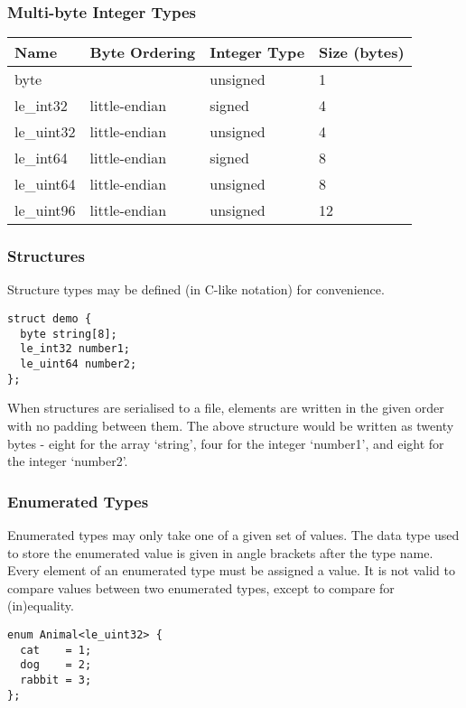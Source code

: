 \documentclass[10pt]{article}
\begin{document}
\subsubsection{Multi-byte Integer Types}
\begin{center}
\begin{tabular}{l l l l}
\hline
\textbf{Name} & \textbf{Byte Ordering} & \textbf{Integer Type} & \textbf{Size (bytes)} \\
\hline
byte & & unsigned & 1 \\
le\_int32 & little-endian & signed & 4 \\
le\_uint32 & little-endian & unsigned & 4 \\
le\_int64 & little-endian & signed & 8 \\
le\_uint64 & little-endian & unsigned & 8 \\
le\_uint96 & little-endian & unsigned & 12 \\
\end{tabular}
\end{center}

\subsubsection{Structures}
Structure types may be defined (in C-like notation) for convenience.

\begin{verbatim}
struct demo {
  byte string[8];
  le_int32 number1;
  le_uint64 number2;
};
\end{verbatim}

When structures are serialised to a file, elements are written in the given order with no padding between them.
The above structure would be written as twenty bytes - eight for the array `string', four for the integer `number1',
and eight for the integer `number2'.

\subsubsection{Enumerated Types}
Enumerated types may only take one of a given set of values.
The data type used to store the enumerated value is given in angle brackets after the type name.
Every element of an enumerated type must be assigned a value.
It is not valid to compare values between two enumerated types,
except to compare for (in)equality.

\begin{verbatim}
enum Animal<le_uint32> {
  cat    = 1;
  dog    = 2;
  rabbit = 3;
};
\end{verbatim}
\end{document}
